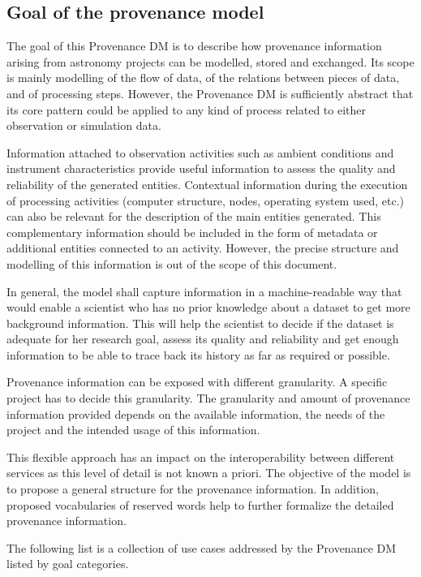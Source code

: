\subsection{Goal of the provenance model}
\label{sec:goals}

The goal of this Provenance DM is to describe how provenance information arising from astronomy projects can be modelled, stored and exchanged. 
Its scope is mainly modelling of the flow of data, of the relations between pieces of data, and of processing steps. 
However, the Provenance DM is sufficiently abstract that its core pattern could be applied to any kind of process related to either observation or simulation data.

Information attached to observation activities such as ambient conditions and instrument characteristics provide useful information to assess the quality and reliability of the generated entities.
Contextual information during the execution of processing activities (computer structure, nodes, operating system used, etc.) can also be relevant for the description of the main entities generated. 
This complementary information should be included in the form of metadata or additional entities connected to an activity. 
However, the precise structure and modelling of this information is out of the scope of this document. 

In general, the model shall capture information in a machine-readable way that would enable a scientist who has no prior knowledge about a dataset to get more background information. 
This will help the scientist to decide if the dataset is adequate for her research goal, assess its quality and reliability and get enough information to be able to trace back its history as far as required or possible. 

Provenance information can be exposed with different granularity. A specific project has to decide this granularity.
The granularity and amount of provenance information provided depends on the available information, the needs of the project and the intended usage of this information.

This flexible approach has an impact on the interoperability between different services as this level of detail is not known a priori.
The objective of the model is to propose a general structure for the provenance information. In addition, proposed vocabularies of reserved words help to further formalize the detailed provenance information.


The following list is a collection of use cases addressed by the Provenance DM listed by goal categories.


